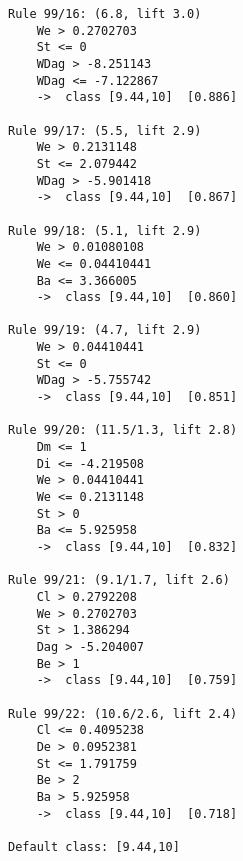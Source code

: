 \begin{tcolorbox}[title=Reglas de clasificación para identificar intervalos de notas.]
\begin{multicols}{3}
\begin{verbatim}
Rule 99/16: (6.8, lift 3.0)
	We > 0.2702703
	St <= 0
	WDag > -8.251143
	WDag <= -7.122867
	->  class [9.44,10]  [0.886]

Rule 99/17: (5.5, lift 2.9)
	We > 0.2131148
	St <= 2.079442
	WDag > -5.901418
	->  class [9.44,10]  [0.867]

Rule 99/18: (5.1, lift 2.9)
	We > 0.01080108
	We <= 0.04410441
	Ba <= 3.366005
	->  class [9.44,10]  [0.860]

Rule 99/19: (4.7, lift 2.9)
	We > 0.04410441
	St <= 0
	WDag > -5.755742
	->  class [9.44,10]  [0.851]

Rule 99/20: (11.5/1.3, lift 2.8)
	Dm <= 1
	Di <= -4.219508
	We > 0.04410441
	We <= 0.2131148
	St > 0
	Ba <= 5.925958
	->  class [9.44,10]  [0.832]

Rule 99/21: (9.1/1.7, lift 2.6)
	Cl > 0.2792208
	We > 0.2702703
	St > 1.386294
	Dag > -5.204007
	Be > 1
	->  class [9.44,10]  [0.759]

Rule 99/22: (10.6/2.6, lift 2.4)
	Cl <= 0.4095238
	De > 0.0952381
	St <= 1.791759
	Be > 2
	Ba > 5.925958
	->  class [9.44,10]  [0.718]

Default class: [9.44,10]
    \end{verbatim}
  \end{multicols}
\label{rules5}
\end{tcolorbox}